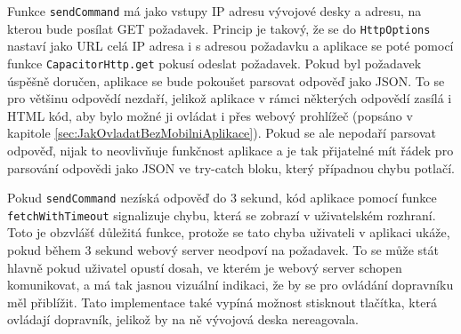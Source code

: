 Funkce \texttt{sendCommand} má jako vstupy IP adresu vývojové desky a adresu, na kterou bude posílat GET požadavek. Princip je takový, že se do \texttt{HttpOptions} nastaví jako URL celá IP adresa i s adresou požadavku a aplikace se poté pomocí funkce \texttt{CapacitorHttp.get} pokusí odeslat požadavek. Pokud byl požadavek úspěšně doručen, aplikace se bude pokoušet parsovat odpověď jako JSON. To se pro většinu odpovědí nezdaří, jelikož aplikace v rámci některých odpovědí zasílá i HTML kód, aby bylo možné ji ovládat i přes webový prohlížeč (popsáno v kapitole \ref{sec:JakOvladatBezMobilniAplikace}). Pokud se ale nepodaří parsovat odpověď, nijak to neovlivňuje funkčnost aplikace a je tak přijatelné mít řádek pro parsování odpovědi jako JSON ve try-catch bloku, který případnou chybu potlačí.

Pokud \texttt{sendCommand} nezíská odpověď do 3 sekund, kód aplikace pomocí funkce \texttt{fetch\-With\-Time\-out} signalizuje chybu, která se zobrazí v uživatelském rozhraní. Toto je obzvlášť důležitá funkce, protože se tato chyba uživateli v aplikaci ukáže, pokud během 3 sekund webový server neodpoví na požadavek. To se může stát hlavně pokud uživatel opustí dosah, ve kterém je webový server schopen komunikovat, a má tak jasnou vizuální indikaci, že by se pro ovládání dopravníku měl přiblížit. Tato implementace také vypíná možnost stisknout tlačítka, která ovládají dopravník, jelikož by na ně vývojová deska nereagovala.

